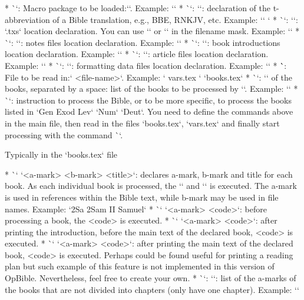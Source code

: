 {{\begitems
* \`\load`: Macro package to be loaded:``. Example: `\load [opbible]` 
* \`\tmark`: `\def\tmark{<t-abbreviation>}`: declaration of the t-abbreviation of a Bible 
translation, e.g., BBE, RNKJV, etc. 
   Example: `\def\tmark{BBE}` `%
* \`\txsfile`: `\def\txsfile {<filename mask>}`: `.txs` location declaration. 
    You can use `\amark` or `\bmark` in the filename mask. 
    Example: `\def\txsfile {./txs/\tmark-\bmark.txs}`
* \`\notesfile`: `\def\notesfile {<filename mask>}`:  notes files location declaration. Example: 
`\def\notesfile {./notes/notes-\amark.tex}`
* \`\introfile`: `\def\introfile {<filename mask>}`:  book introductions location declaration. 
Example: `\def\introfile {./intros/intro-\amark.tex}`
* \`\articlefile`: `\def\articlefile {<filename mask>}`: article files location declaration. 
   Example: `\def\articlefile {./articles/articles-\amark.tex}`
* \`\fmtfile`: `\def\fmtfile {<filename mask>}`:  formatting data files location declaration. 
Example: `\def\fmtfile {./fmt/fmt-\tmark-\amark.tex}`
* \``: File to be read in:` {<file-name>}`. Example: `  {vars.tex} ` 
`{books.tex}`
* \`\printedbooks`: `\def\printedbooks {<list of a-marks>}` of the books, separated by a space:
    list of the books to be processed by `\processbooks`. Example: `\def\printedbooks {Gen Exod Lev` 
    `Num` `Deut}`
* \`\processbooks`: instruction to process the Bible, or to be more  specific, to process the books 
listed in `\printedbooks`.
\enditems
You need to define the commands above in the main file, then
read in the files `books.tex`, `vars.tex` and finally start processing with the command
\`\processbooks`.

\secc Typically in the `books.tex` file

\begitems
* \`\BookTitle` `<a-mark> <b-mark> <title>`: declares  a-mark, b-mark and title for each book. 
  As each individual book is processed, the  `\def\amark{<a-mark>}` and `\def\bmark{b-mark}` is 
  executed. 
  The a-mark is used in references within the Bible text, while  b-mark may be used in file names.
  Example: `\BookTitle 2Sa 2Sam {II Samuel}`
* \`\BookException` `<a-mark> {<code>}`: before processing a book, the
  <code> is executed.
* \`\BookPre` `<a-mark> {<code>}`: after printing the introduction, before the main text of
  the declared book, <code> is executed.
* \`\BookPost` `<a-mark> {<code>}`: after printing the main text of the declared book, <code> is 
executed.
  Perhaps could be found useful for printing a reading plan but such example of this feature is not 
  implemented in this version of OpBible. 
  Nevertheless, feel free to create your own.
* \`\nochapbooks`: `\def\nochapbooks{<list>}`: list of the a-marks of the books that
  are not divided into chapters (only have one chapter). Example: `\def\nochabooks {Obad Phlm 2John 
  3 John` `Jude}`
\enditems

}}
